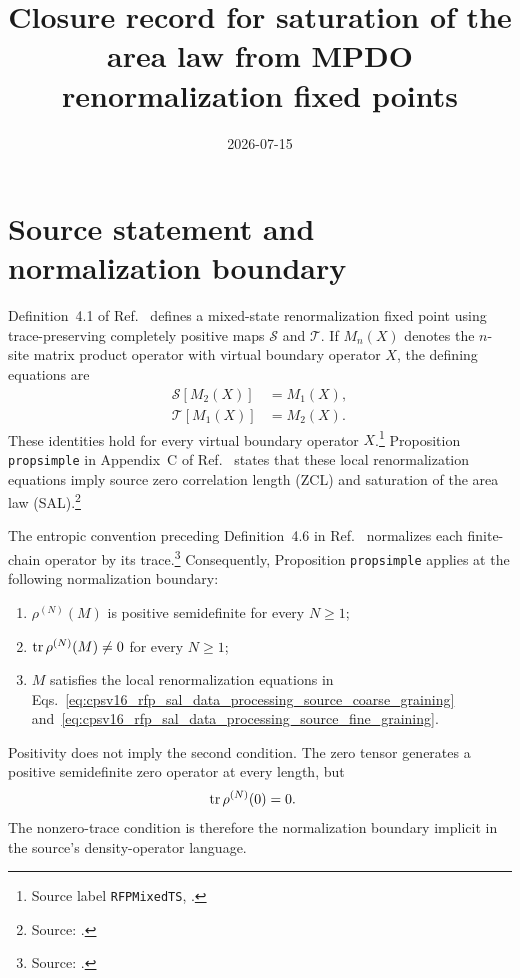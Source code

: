 \documentclass{article}
\title{Closure record for saturation of the area law from MPDO
renormalization fixed points}
\author{}
\date{2026-07-15}
\begin{document}
\maketitle
{}

\section{Source statement and normalization boundary}

Definition~4.1 of Ref.~\cite{Cirac2016MPDO_arXiv} defines a mixed-state
renormalization fixed point using trace-preserving completely positive maps
$\mathcal S$ and $\mathcal T$. If $M_n(X)$ denotes the $n$-site matrix product
operator with virtual boundary operator $X$, the defining equations are
\begin{align}
    \mathcal S[M_2(X)]
        &=
        M_1(X),
    \label{eq:cpsv16_rfp_sal_data_processing_source_coarse_graining}\\
    \mathcal T[M_1(X)]
        &=
        M_2(X).
    \label{eq:cpsv16_rfp_sal_data_processing_source_fine_graining}
\end{align}
These identities hold for every virtual boundary operator $X$.\footnote{Source
label \texttt{RFPMixedTS},
.}
Proposition \texttt{propsimple} in Appendix~C of
Ref.~\cite{Cirac2016MPDO_arXiv} states that these local renormalization
equations imply source zero correlation length (ZCL) and saturation of the area
law (SAL).\footnote{Source:
.}

The entropic convention preceding Definition~4.6 in
Ref.~\cite{Cirac2016MPDO_arXiv} normalizes each finite-chain operator by its
trace.\footnote{Source:
.}
Consequently, Proposition \texttt{propsimple} applies at the following
normalization boundary:
\begin{enumerate}
    \item $\rho^{(N)}(M)$ is positive semidefinite for every $N\geq 1$;
    \item $\operatorname{tr}\rho^{(N)}(M)\ne 0$ for every $N\geq 1$;
    \item $M$ satisfies the local renormalization equations in
    Eqs.~\ref{eq:cpsv16_rfp_sal_data_processing_source_coarse_graining}
    and~\ref{eq:cpsv16_rfp_sal_data_processing_source_fine_graining}.
\end{enumerate}
Positivity does not imply the second condition. The zero tensor generates a
positive semidefinite zero operator at every length, but
\begin{align}
    \operatorname{tr}\rho^{(N)}(0)
        &=
        0.
    \label{eq:cpsv16_rfp_sal_data_processing_zero_tensor_trace}
\end{align}
The nonzero-trace condition is therefore the normalization boundary implicit
in the source's density-operator language.
\end{document}
